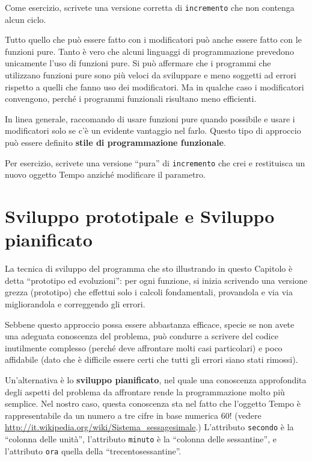 \documentclass[10pt]{book}
\begin{document}
Come esercizio, scrivete una versione corretta di {\tt incremento} che non contenga alcun ciclo.

Tutto quello che può essere fatto con i modificatori può anche essere fatto con le funzioni pure. Tanto è vero che alcuni linguaggi di programmazione prevedono unicamente l'uso di funzioni pure. Si può affermare che i programmi che utilizzano funzioni pure sono più veloci da sviluppare e meno soggetti ad errori rispetto a quelli che fanno uso dei modificatori. Ma in qualche caso i modificatori convengono, perché i programmi funzionali risultano meno efficienti.

In linea generale, raccomando di usare funzioni pure quando possibile e usare i modificatori solo se c'è un evidente vantaggio nel farlo. Questo tipo di approccio può essere definito {\bf stile di programmazione funzionale}.

Per esercizio, scrivete una versione ``pura'' di {\tt incremento} che crei e restituisca un nuovo oggetto Tempo anziché modificare il parametro.


\section{Sviluppo prototipale e Sviluppo pianificato}
\label{prototype}

La tecnica di sviluppo del programma che sto illustrando in questo Capitolo è detta ``prototipo ed evoluzioni'': per ogni funzione, si inizia scrivendo una versione grezza (prototipo) che effettui solo i calcoli fondamentali, provandola e via via migliorandola e correggendo gli errori.

Sebbene questo approccio possa essere abbastanza efficace, specie se non avete una adeguata conoscenza del problema, può condurre a scrivere del codice inutilmente complesso (perché deve affrontare molti casi particolari) e poco affidabile (dato che è difficile essere certi che tutti gli errori siano stati rimossi).

Un'alternativa è lo {\bf sviluppo pianificato}, nel quale una conoscenza approfondita degli aspetti del problema da affrontare rende la programmazione molto più semplice. Nel nostro caso, questa conoscenza sta nel fatto che l'oggetto Tempo è rappresentabile da un numero a tre cifre in base numerica 60! (vedere \url{http://it.wikipedia.org/wiki/Sistema_sessagesimale}.)  L'attributo
{\tt secondo} è la ``colonna delle unità'', l'attributo {\tt minuto}
è la ``colonna delle sessantine'', e l'attributo {\tt ora} quella della ``trecentosessantine''.
\end{document}

